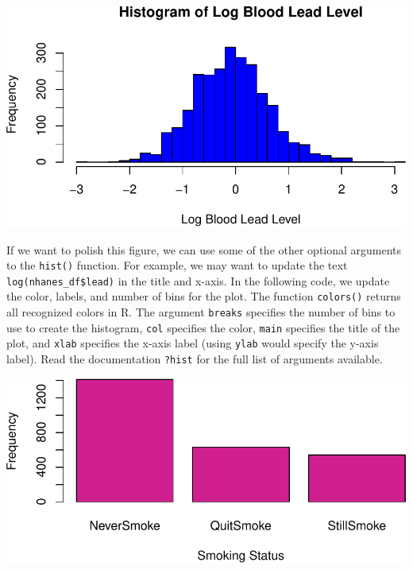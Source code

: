 \documentclass[
  letterpaper,
]{latex/krantz}
\makeatletter
\newenvironment{Shaded}{\begin{snugshade}}{\end{snugshade}}
\newcommand{\AttributeTok}[1]{\textcolor[rgb]{0.40,0.45,0.13}{#1}}
\newcommand{\DecValTok}[1]{\textcolor[rgb]{0.68,0.00,0.00}{#1}}
\newcommand{\FunctionTok}[1]{\textcolor[rgb]{0.28,0.35,0.67}{#1}}
\newcommand{\NormalTok}[1]{\textcolor[rgb]{0.00,0.23,0.31}{#1}}
\newcommand{\SpecialCharTok}[1]{\textcolor[rgb]{0.37,0.37,0.37}{#1}}
\newcommand{\StringTok}[1]{\textcolor[rgb]{0.13,0.47,0.30}{#1}}
\newenvironment{kframe}{%
\medskip{}
\setlength{\fboxsep}{.8em}
 \def\at@end@of@kframe{}%
 \ifinner\ifhmode%
  \def\at@end@of@kframe{\end{minipage}}%
  \begin{minipage}{\columnwidth}%
 \fi\fi%
 \def\FrameCommand##1{\hskip\@totalleftmargin \hskip-\fboxsep
 \colorbox{shadecolor}{##1}\hskip-\fboxsep
     \hskip-\linewidth \hskip-\@totalleftmargin \hskip\columnwidth}%
 \MakeFramed {\advance\hsize-\width
   \@totalleftmargin\z@ \linewidth\hsize
   \@setminipage}}%
 {\par\unskip\endMakeFramed%
 \at@end@of@kframe}
\renewenvironment{Shaded}{\begin{kframe}}{\end{kframe}}
\makeatother
\begin{document}
\begin{center}
\includegraphics[width=1\textwidth,height=\textheight]{book/exploratory_analysis_files/figure-pdf/unnamed-chunk-9-1.pdf}
\end{center}

If we want to polish this figure, we can use some of the other optional
arguments  to the \texttt{hist()} function.
For example, we may want to update the text
\texttt{log(nhanes\_df\$lead)} in the title and x-axis. In the following
code, we update the color, labels, and number of bins for the plot. The
function \texttt{colors()} returns all recognized colors in R. The
argument \texttt{breaks} specifies the number of bins to use to create
the histogram, \texttt{col} specifies the color, \texttt{main} specifies
the title of the plot, and \texttt{xlab} specifies the x-axis label
(using \texttt{ylab} would specify the y-axis label). Read the
documentation \texttt{?hist} for the full list of arguments available.

\begin{Shaded}
\end{Shaded}

\begin{center}
\includegraphics[width=1\textwidth,height=\textheight]{book/exploratory_analysis_files/figure-pdf/unnamed-chunk-10-1.pdf}
\end{center}
\end{document}

